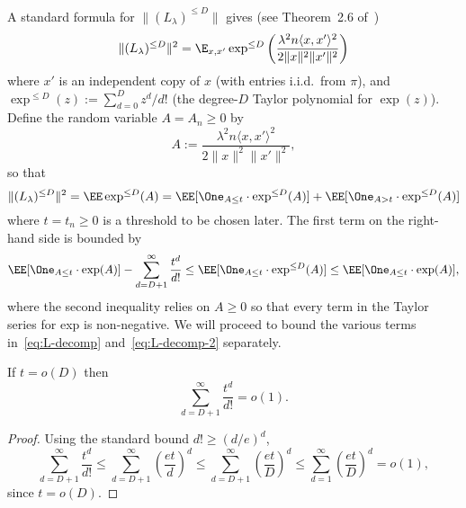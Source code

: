\documentclass[11pt]{article}
\begin{document}
A standard formula for $\|(L_\lambda)^{\le D}\|$ gives (see Theorem~2.6 of~\cite{ld-notes})
\[ \|(L_\lambda)^{\le D}\|^2 = \E_{x,x'} \exp^{\le D}\left(\frac{\lambda^2 n \langle x,x' \rangle^2}{2 \|x\|^2 \|x'\|^2}\right) \]
where $x'$ is an independent copy of $x$ (with entries i.i.d.\ from $\pi$), and $\exp^{\le D}(z) := \sum_{d=0}^D z^d/d!$ (the degree-$D$ Taylor polynomial for $\exp(z)$). Define the random variable $A = A_n \ge 0$ by
\begin{equation}\label{eq:def-A}
A := \frac{\lambda^2 n \langle x,x' \rangle^2}{2 \|x\|^2 \|x'\|^2},
\end{equation}
so that
\begin{equation}\label{eq:L-decomp}
\|(L_\lambda)^{\le D}\|^2 = \EE \exp^{\le D}(A) = \EE[\One_{A \le t} \cdot \exp^{\le D}(A)] + \EE[\One_{A > t} \cdot \exp^{\le D}(A)]
\end{equation}
where $t = t_n \ge 0$ is a threshold to be chosen later. The first term on the right-hand side is bounded by
\begin{equation}\label{eq:L-decomp-2}
\EE[\One_{A \le t} \cdot \exp(A)] - \sum_{d=D+1}^\infty \frac{t^d}{d!} \le \EE[\One_{A \le t} \cdot \exp^{\le D}(A)] \le \EE[\One_{A \le t} \cdot \exp(A)],
\end{equation}
where the second inequality relies on $A \ge 0$ so that every term in the Taylor series for exp is non-negative. We will proceed to bound the various terms in~\eqref{eq:L-decomp} and~\eqref{eq:L-decomp-2} separately.

\begin{lemma}\label{lem:L-term-1}
If $t = o(D)$ then
\[ \sum_{d=D+1}^\infty \frac{t^d}{d!} = o(1). \]
\end{lemma}
\begin{proof}
Using the standard bound $d! \ge (d/e)^d$,
\[ \sum_{d=D+1}^\infty \frac{t^d}{d!} \le \sum_{d=D+1}^\infty \left(\frac{et}{d}\right)^d \le \sum_{d=D+1}^\infty \left(\frac{et}{D}\right)^d \le \sum_{d=1}^\infty \left(\frac{et}{D}\right)^d = o(1), \]
since $t=o(D)$.
\end{proof}
\end{document}
